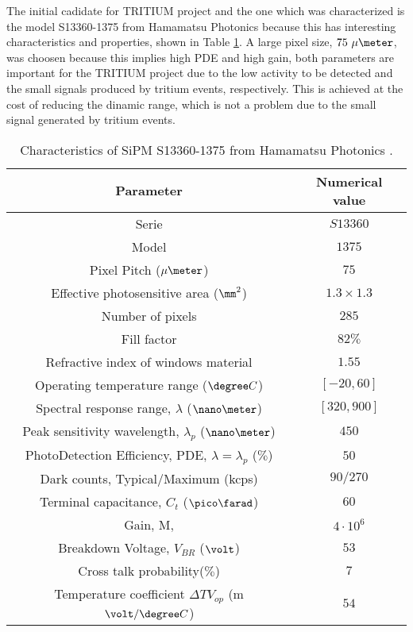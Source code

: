 The initial cadidate for TRITIUM project and the one which was characterized is the model S13360-1375 from Hamamatsu Photonics \cite{DataSheetHammamatsu_1_SiPM_1375} because this has interesting characteristics and properties, shown in Table \ref{tab:PropertiesOfSiPM1375}. A large pixel size, $75~\mu\meter$, was choosen because this implies high PDE and high gain, both parameters are important for the TRITIUM project due to the low activity to be detected and the small signals produced by tritium events, respectively. This is achieved at the cost of reducing the dinamic range, which is not a problem due to the small signal generated by tritium events.

\begin{table}[htbp]
\begin{center}
\begin{tabular}{|c|c|}
\hline
Parameter & Numerical value \\
\hline \hline \hline
Serie & $S13360$ \\ \hline
Model & $1375$ \\ \hline
Pixel Pitch ($\mu\meter$) & $75$ \\ \hline
Effective photosensitive area ($\mm^2$) & $1.3 \times 1.3$ \\ \hline
Number of pixels & $285$ \\ \hline
Fill factor & $82\%$ \\ \hline
Refractive index of windows material & $1.55$ \\ \hline
Operating temperature range ($\degree C$)& $[-20,60]$ \\ \hline
Spectral response range, $\lambda$ ($\nano\meter$) & $[320, 900]$ \\ \hline
Peak sensitivity wavelength, $\lambda_p$ ($\nano\meter$) & $450$ \\ \hline
PhotoDetection Efficiency, PDE, $\lambda=\lambda_p$ ($\%$) & $50$ \\ \hline
Dark counts, Typical/Maximum (kcps) & $90/270$ \\ \hline
Terminal capacitance, $C_t$ ($\pico\farad$) & $60$ \\ \hline
Gain, M, & $4 \cdot{} 10^6$ \\ \hline
Breakdown Voltage, $V_{BR}$ ($\volt$) & $53$ \\ \hline
Cross talk probability($\%$) & $7$ \\ \hline
Temperature coefficient $\Delta TV_{op}$ (m$\volt/\degree C$) & $54$ \\ \hline
\end{tabular}
\caption{Characteristics of SiPM S13360-1375 from Hamamatsu Photonics \cite{DataSheetHammamatsu_1_SiPM_1375}.}
\label{tab:PropertiesOfSiPM1375}
\end{center}
\end{table}

